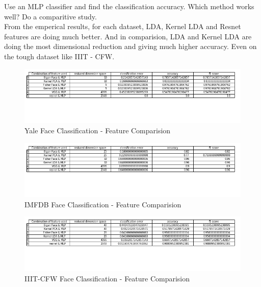\documentclass[12pt]{article}
\newenvironment{problem}[2][Problem]{\begin{trivlist}
\item[\hskip \labelsep {\bfseries #1}\hskip \labelsep {\bfseries #2.}]}{\end{trivlist}}
\begin{document}
\begin{problem}{2}
	Use an MLP classifier and find the classification accuracy. Which method works well? Do a comparitive
	study.
	\\
	From the emperical results, for each dataset, LDA, Kernel LDA and Resnet features are doing much better. And in comparision, LDA and Kernel LDA are doing the most dimensional reduction and giving much higher accuracy. Even on the tough dataset like IIIT - CFW. 
	
	
			\begin{figure}[H]
		\centering
		\includegraphics[width=16cm]{Yale_Face_Classification_Feature_Comparision.png}
		\caption{Yale Face Classification - Feature Comparision}
		\label{fig:verticalcell}
	\end{figure}
	
	
	\begin{figure}[H]
		\centering
		\includegraphics[width=16cm]{IMFDB_Face_Classification_Feature_Comparision.png}
		\caption{IMFDB Face Classification - Feature Comparision}
		\label{fig:verticalcell}
	\end{figure}


	
	\begin{figure}[H]
		\centering
		\includegraphics[width=16cm]{IIIT_CFW_Face_Classification_Feature_Comparision.png}
		\caption{IIIT-CFW Face Classification - Feature Comparision}
		\label{fig:verticalcell}
	\end{figure}
	
\end{problem}
\end{document}
